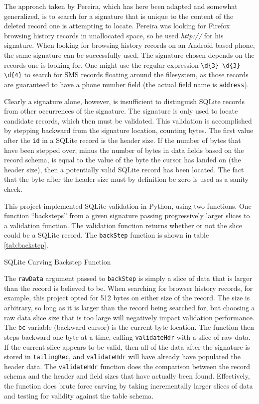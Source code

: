 The approach taken by Pereira, which has here been adapted and somewhat generalized, is to search for a signature that is unique to
the content of the deleted record one is attempting to locate.  Pereira was looking for Firefox browsing history records in
unallocated space, so he used \emph{http://} for his signature.  When looking for browsing history records on an Android based
phone, the same signature can be successfully used.  The signature chosen depends on the records one is looking for.  One might use
the regular expression \verb|\d{3}-\d{3}-\d{4}| to search for SMS records floating around the filesystem, as those records are guaranteed
to have a phone number field (the actual field name is \texttt{address}). 

Clearly a signature alone, however, is insufficient to distinguish SQLite records from other occurrences of the signature.  The
signature is only used to locate candidate records, which then must be validated.  This validation is accomplished by stepping
backward from the signature location, counting bytes.  The first value after the \texttt{id} in a SQLite record is the header size.
If the number of bytes that have been stepped over, minus the number of bytes in data fields based on the record schema, is equal to
the value of the byte the cursor has landed on (the header size), then a potentially valid SQLite record has been located.  The fact
that the byte after the header size must by definition be zero is used as a sanity check.

This project implemented SQLite validation in Python, using two functions.  One function ``backsteps'' from a given signature
passing progressively larger slices to a validation function.  The validation function returns whether or not the slice could be a
SQLite record.  The \texttt{backStep} function is shown in table \ref{tab:backstep}. 

\begin{table}

\caption{SQLite Carving Backstep Function}
\label{tab:backstep}
\end{table}

The \texttt{rawData} argument passed to \texttt{backStep} is simply a slice of data that is larger than the record is believed to
be.  When searching for browser history records, for example, this project opted for 512 bytes on either size of the record.  The
size is arbitrary, so long as it is larger than the record being searched for, but choosing a raw data slice size that is too large
will negatively impact validation performance.  The \texttt{bc} variable (backward cursor) is the current byte location.  The
function then steps backward one byte at a time, calling \texttt{validateHdr} with a slice of raw data.  If the current
slice appears to be valid, then all of the data after the signature is stored in \texttt{tailingRec}, and \texttt{validateHdr} will
have already have populated the header data.  The \texttt{validateHdr} function does the comparison between the record schema and
the header and field sizes that have actually been found.  Effectively, the function does brute force carving by taking
incrementally larger slices of data and testing for validity against the table schema.

